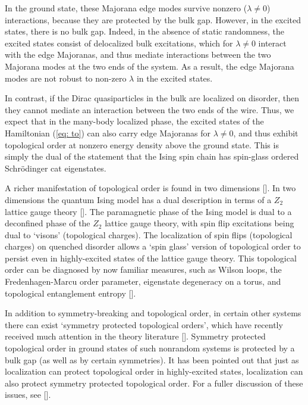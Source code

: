 \documentclass[amsmath,onecolumn, superscriptaddress,preprint,aps]{revtex4}
\renewcommand{\cite}[1]{[\onlinecite{#1}]}
\begin{document}
In the ground state, these Majorana edge modes survive nonzero ($\lambda\neq 0$) interactions, because they are protected by the bulk gap.  However, in the excited states, there is no bulk gap.  Indeed, in the absence of static randomness, the excited states consist of delocalized bulk excitations, which for $\lambda\neq 0$ interact with the edge Majoranas, and thus mediate interactions between the two Majorana modes at the two ends of the system.  As a result, the edge Majorana modes are not robust to non-zero $\lambda$ in the excited states.

In contrast, if the Dirac quasiparticles in the bulk are localized on disorder, then they cannot mediate an interaction between the two ends of the wire. Thus, we expect that in the many-body localized phase, the excited states of the Hamiltonian (\ref{eq: to}) can also carry edge Majoranas for $\lambda\neq 0$, and thus exhibit topological order at nonzero energy density above the ground state.  This is simply the dual of the statement that the Ising spin chain has spin-glass ordered Schr\"odinger cat eigenstates.

A richer manifestation of topological order is found in two dimensions \cite{LPQO, Bauer}. In two dimensions the quantum Ising model has a dual description in terms of a $Z_2$ lattice gauge theory \cite{Fradkin}.  The paramagnetic phase of the Ising model is dual to a deconfined phase of the $Z_2$ lattice gauge theory, with spin flip excitations being dual to `visons' (topological charges).  The localization of spin flips (topological charges) on quenched disorder allows a `spin glass' version of topological order to persist even in highly-excited states of the lattice gauge theory.  This topological order can be diagnosed by now familiar measures, such as Wilson loops, the Fredenhagen-Marcu order parameter, eigenstate degeneracy on a torus, and topological entanglement entropy \cite{LPQO}.

In addition to symmetry-breaking and topological order, in certain other systems there can exist `symmetry protected topological orders', which have recently received much attention in the theory literature \cite{Senthil}.  Symmetry protected topological order in ground states of such nonrandom systems is protected by a bulk gap (as well as by certain symmetries).  It has been pointed out that just as localization can protect topological order in highly-excited states, localization can also protect symmetry protected topological order.  For a fuller discussion of these issues, see \cite{Bahri, Chandran}.
\end{document}
